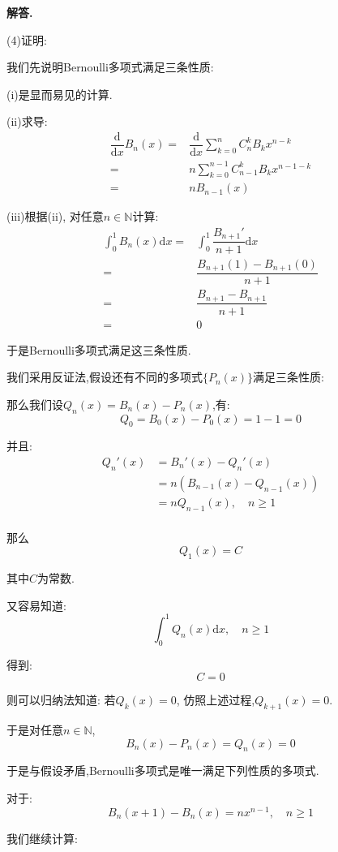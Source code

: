 \documentclass[12pt, a4paper, oneside]{ctexart}
\newenvironment{solution}{\par\noindent\textbf{解答. }}{\par}
\begin{document}
\begin{solution}
\par
(4)证明:
\par
我们先说明Bernoulli多项式满足三条性质:
\par
(i)是显而易见的计算.
\par
(ii)求导:
$$
\begin{aligned}
\dfrac{\mathrm{d}}{\mathrm{d}x}B_n(x)
=&\dfrac{\mathrm{d}}{\mathrm{d}x}\sum_{k=0}^{n}C_n^kB_kx^{n-k}\\
=&n\sum_{k=0}^{n-1}C_{n-1}^{k}B_kx^{n-1-k}\\
=&nB_{n-1}(x)
\end{aligned}
$$
\par
(iii)根据(ii),
对任意$n\in \mathbb{N}$计算:
$$
\begin{aligned}
\int_{0}^{1}B_n(x)\mathrm{d}x
=&\int_{0}^{1}\dfrac{B_{n+1}'}{n+1}\mathrm{d}x\\
=&\dfrac{B_{n+1}(1)-B_{n+1}(0)}{n+1}\\
=&\dfrac{B_{n+1}-B_{n+1}}{n+1}\\
=&0
\end{aligned}
$$
\par
于是Bernoulli多项式满足这三条性质.
\par
我们采用反证法,假设还有不同的多项式$\{P_n(x)\}$满足三条性质:
\par
那么我们设$Q_n(x)=B_n(x)-P_n(x)$,有:
$$
Q_0=B_0(x)-P_0(x)=1-1=0
$$
\par
并且:
$$
\begin{aligned}
Q_n'(x)
&=B_n'(x)-Q_n'(x)\\
&=n(B_{n-1}(x)-Q_{n-1}(x))\\
&=nQ_{n-1}(x),\quad n\geqslant 1\\
\end{aligned}
$$
\par
那么$$
Q_1(x)=C
$$
\par
其中$C$为常数.
\par
又容易知道:
$$
\int_{0}^{1}Q_n(x)\mathrm{d}x, \quad n\geqslant 1
$$
\par
得到:$$
C=0
$$
\par
则可以归纳法知道:
若$Q_k(x)=0$,
仿照上述过程,$Q_{k+1}(x)=0$.
\par
于是对任意$n\in \mathbb{N}$,
$$
B_n(x)-P_n(x)=Q_n(x)=0
$$
\par
于是与假设矛盾,Bernoulli多项式是唯一满足下列性质的多项式.
\par
对于:
$$
B_n(x+1)-B_n(x)=nx^{n-1},\quad n \geqslant 1
$$
\par
我们继续计算:
$$
\begin{aligned}

\end{aligned}$$
\end{solution}
\end{document}
